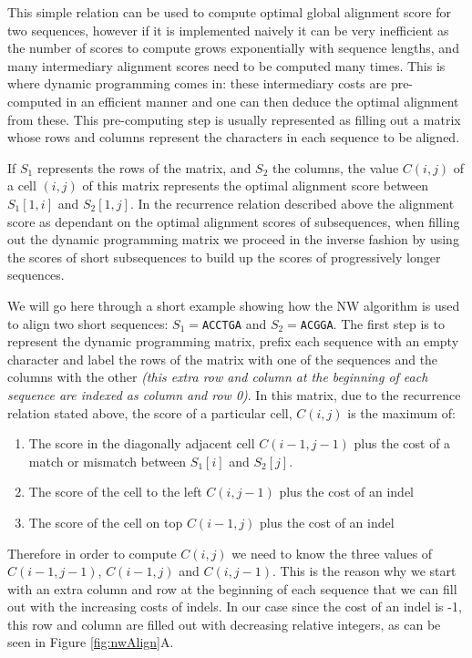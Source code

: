 \documentclass[
  11pt,
  twoside,
  BCOR=10mm,
  listof=totoc]{scrbook}
\providecommand{\tightlist}{%
  \setlength{\itemsep}{0pt}\setlength{\parskip}{0pt}}
\begin{document}
This simple relation can be used to compute optimal global alignment score for two sequences, however if it is implemented naively it can be very inefficient as the number of scores to compute grows exponentially with sequence lengths, and many intermediary alignment scores need to be computed many times. This is where dynamic programming comes in: these intermediary costs are pre-computed in an efficient manner and one can then deduce the optimal alignment from these. This pre-computing step is usually represented as filling out a matrix whose rows and columns represent the characters in each sequence to be aligned.

If \(S_1\) represents the rows of the matrix, and \(S_2\) the columns, the value \(C(i,j)\) of a cell \((i,j)\) of this matrix represents the optimal alignment score between \(S_1[1,i]\) and \(S_2[1,j]\). In the recurrence relation described above the alignment score as dependant on the optimal alignment scores of subsequences, when filling out the dynamic programming matrix we proceed in the inverse fashion by using the scores of short subsequences to build up the scores of progressively longer sequences.

We will go here through a short example showing how the NW algorithm is used to align two short sequences: \(S_1=\)\texttt{ACCTGA} and \(S_2=\)\texttt{ACGGA}. The first step is to represent the dynamic programming matrix, prefix each sequence with an empty character and label the rows of the matrix with one of the sequences and the columns with the other \emph{(this extra row and column at the beginning of each sequence are indexed as column and row 0)}. In this matrix, due to the recurrence relation stated above, the score of a particular cell, \(C(i,j)\) is the maximum of:

\begin{enumerate}
\def\labelenumi{\arabic{enumi}.}
\tightlist
\item
  The score in the diagonally adjacent cell \(C(i-1,j-1)\) plus the cost of a match or mismatch between \(S_1[i]\) and \(S_2[j]\).
\item
  The score of the cell to the left \(C(i,j-1)\) plus the cost of an indel
\item
  The score of the cell on top \(C(i-1,j)\) plus the cost of an indel
\end{enumerate}

Therefore in order to compute \(C(i,j)\) we need to know the three values of \(C(i-1,j-1)\), \(C(i-1,j)\) and \(C(i,j-1)\). This is the reason why we start with an extra column and row at the beginning of each sequence that we can fill out with the increasing costs of indels. In our case since the cost of an indel is -1, this row and column are filled out with decreasing relative integers, as can be seen in Figure \ref{fig:nwAlign}A.
\end{document}
